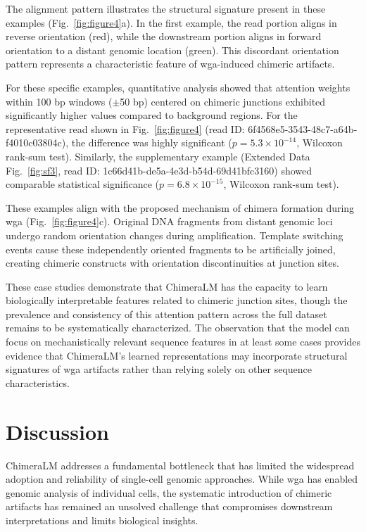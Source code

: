 \documentclass[pdflatex,sn-nature]{sn-jnl}%
\theoremstyle{thmstyleone}%
\theoremstyle{thmstyletwo}%
\theoremstyle{thmstylethree}%
\begin{document}
The alignment pattern illustrates the structural signature present in these examples (Fig.~\ref{fig:figure4}a).
In the first example, the read portion aligns in reverse orientation (red), while the downstream portion aligns in forward orientation to a distant genomic location (green).
This discordant orientation pattern represents a characteristic feature of \gls{wga}-induced chimeric artifacts.

For these specific examples, quantitative analysis showed that attention weights within 100 bp windows ($\pm$50 bp) centered on chimeric junctions exhibited significantly higher values compared to background regions.
For the representative read shown in Fig.~\ref{fig:figure4} (read ID: 6f4568e5-3543-48c7-a64b-f4010c03804c), the difference was highly significant ($p = 5.3 \times 10^{-14}$, Wilcoxon rank-sum test).
Similarly, the supplementary example (Extended Data Fig.~\ref{fig:sf3}, read ID: 1c66d41b-de5a-4e3d-b54d-69d41bfc3160) showed comparable statistical significance ($p = 6.8 \times 10^{-15}$, Wilcoxon rank-sum test).

These examples align with the proposed mechanism of chimera formation during \gls{wga} (Fig.~\ref{fig:figure4}c).
Original DNA fragments from distant genomic loci undergo random orientation changes during amplification.
Template switching events cause these independently oriented fragments to be artificially joined, creating chimeric constructs with orientation discontinuities at junction sites.

These case studies demonstrate that ChimeraLM has the capacity to learn biologically interpretable features related to chimeric junction sites, though the prevalence and consistency of this attention pattern across the full dataset remains to be systematically characterized.
The observation that the model can focus on mechanistically relevant sequence features in at least some cases provides evidence that ChimeraLM's learned representations may incorporate structural signatures of \gls{wga} artifacts rather than relying solely on other sequence characteristics.

\section*{Discussion}
ChimeraLM addresses a fundamental bottleneck that has limited the widespread adoption and reliability of single-cell genomic approaches.
While \gls{wga} has enabled genomic analysis of individual cells, the systematic introduction of chimeric artifacts has remained an unsolved challenge that compromises downstream interpretations and limits biological insights.
\end{document}
